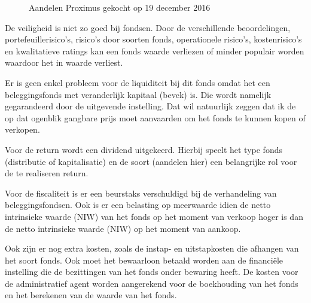 \begin{figure}[tbph!]
	\centering
	\caption[Aandelen Proximus]{Aandelen Proximus gekocht op 19 december 2016}
	\label{fig:overzichtsitetijdbefondsenenaandelen}
\end{figure}
\newpage
De veiligheid is niet zo goed bij fondsen. Door de verschillende beoordelingen, portefeuillerisico's, risico's door soorten fonds, operationele risico's, kostenrisico's en kwalitatieve ratings kan een fonds waarde verliezen of minder populair worden waardoor het in waarde verliest.

Er is geen enkel probleem voor de liquiditeit bij dit fonds omdat het een beleggingsfonds met veranderlijk kapitaal (bevek) is. Die wordt namelijk gegarandeerd door de uitgevende instelling. Dat wil natuurlijk zeggen dat ik de op dat ogenblik gangbare prijs moet aanvaarden om het fonds te kunnen kopen of verkopen.

Voor de return wordt een dividend uitgekeerd. Hierbij speelt het type fonds (distributie of kapitalisatie) en de soort (aandelen hier) een belangrijke rol voor de te realiseren return.

Voor de fiscaliteit is er een beurstaks verschuldigd bij de verhandeling van beleggingsfondsen. Ook is er een belasting op meerwaarde idien de netto intrinsieke waarde (NIW) van het fonds op het moment van verkoop hoger is dan de netto intrinsieke waarde (NIW) op het moment van aankoop.

Ook zijn er nog extra kosten, zoals de instap- en uitstapkosten die afhangen van het soort fonds. Ook moet het bewaarloon betaald worden aan de financiële instelling die de bezittingen van het fonds onder bewaring heeft. De kosten voor de administratief agent worden aangerekend voor de boekhouding van het fonds en het berekenen van de waarde van het fonds.


